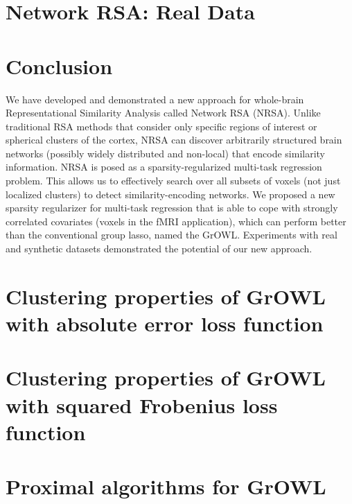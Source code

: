 \documentclass{article}
\begin{document}
	\section{Network RSA: Real Data}
        \label{wbrsa2}
	
	
	\section{Conclusion}
We have developed and demonstrated a new approach for whole-brain Representational Similarity Analysis called Network RSA (NRSA). Unlike traditional RSA methods that consider only specific regions of interest or spherical clusters of the cortex,  NRSA can discover arbitrarily structured brain networks (possibly widely distributed and non-local) that encode similarity information.  NRSA is posed as a sparsity-regularized multi-task regression problem. This allows us to effectively search over all subsets of voxels (not just localized clusters) to detect similarity-encoding networks.  We proposed a new sparsity regularizer for multi-task regression that is able to cope with strongly correlated covariates (voxels in the fMRI application),
which can perform better than the conventional group lasso, named the GrOWL.  Experiments with real and synthetic datasets demonstrated the potential of our new approach.
	
	\section{Clustering properties of GrOWL with absolute error loss function}
	
	
	\section{Clustering properties of GrOWL with squared Frobenius loss function}
	
	
	\section{Proximal algorithms for GrOWL}
	
	

\nocite{langley00}
\end{document}
